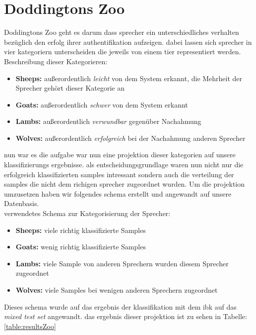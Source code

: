 \section{Doddingtons Zoo}


Doddingtons Zoo
geht es darum dass sprecher ein unterschiedliches verhalten bezüglich den erfolg ihrer authentifikation aufzeigen. \cite{zoo}
dabei lassen sich sprecher in vier kategoriern unterscheiden die jeweils von einem tier representiert werden. \\

Beschreibung dieser Kategorieren:
\begin{itemize}
	\item[\textbullet]  \textbf{Sheeps:} außerordentlich \textit{leicht} von dem System erkannt, die Mehrheit der Sprecher gehört dieser Kategorie an
	\item[\textbullet]  \textbf{Goats:} außerordentlich \textit{schwer} von dem System erkannt
	\item[\textbullet]  \textbf{Lambs:} außerordentlich \textit{verwundbar} gegenüber Nachahmung
	\item[\textbullet]  \textbf{Wolves:} außerordentlich \textit{erfolgreich} bei der Nachahmung anderen Sprecher
\end{itemize}
\cite{dittmann}


nun war es die aufgabe war nun eine projektion dieser kategorien auf unsere klassifizierungs ergebnisse. als entscheidungsgrundlage waren nun nicht nur  die erfolgreich klassifizierten samples intressant sondern auch die verteilung der samples die nicht dem richigen sprecher zugeordnet wurden. Um die projektion umzusetzen haben wir folgendes schema erstellt und angewandt auf unsere Datenbasis.\\

verwendetes Schema zur Kategorisierung der Sprecher:
\begin{itemize}
	\item[\textbullet]  \textbf{Sheeps:} viele richtig klassifizierte Samples
	\item[\textbullet]  \textbf{Goats:} wenig richtig klassifizierte Samples
	\item[\textbullet]  \textbf{Lambs:} viele Sample von anderen Sprechern wurden diesem Sprecher zugeordnet
	\item[\textbullet]  \textbf{Wolves:} viele Samples bei wenigen anderen Sprechern zugeordnet
\end{itemize}

Dieses schema wurde auf das ergebnis der klassifikation mit dem ibk auf das \textit{mixed test set} angewandt. das ergebnis dieser projektion ist zu sehen in Tabelle:\ref{table:resultsZoo}



